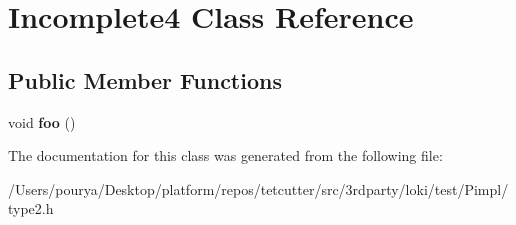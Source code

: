 \hypertarget{classIncomplete4}{}\section{Incomplete4 Class Reference}
\label{classIncomplete4}
\subsection*{Public Member Functions}
\begin{DoxyCompactItemize}
\item 
\hypertarget{classIncomplete4_a8e82a5df2e33a391f2b92f0c47f0c65b}{}void {\bfseries foo} ()\label{classIncomplete4_a8e82a5df2e33a391f2b92f0c47f0c65b}

\end{DoxyCompactItemize}


The documentation for this class was generated from the following file\+:\begin{DoxyCompactItemize}
\item 
/\+Users/pourya/\+Desktop/platform/repos/tetcutter/src/3rdparty/loki/test/\+Pimpl/type2.\+h\end{DoxyCompactItemize}
